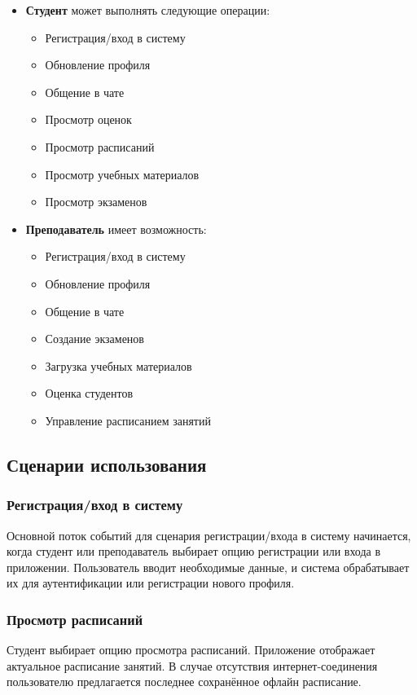 \documentclass[a4paper,12pt]{article}
\begin{document}
\begin{itemize}
    \item \textbf{Студент} может выполнять следующие операции:
    \begin{itemize}
        \item Регистрация/вход в систему
        \item Обновление профиля
        \item Общение в чате
        \item Просмотр оценок
        \item Просмотр расписаний
        \item Просмотр учебных материалов
        \item Просмотр экзаменов
    \end{itemize}
    \item \textbf{Преподаватель} имеет возможность:
    \begin{itemize}
        \item Регистрация/вход в систему
        \item Обновление профиля
        \item Общение в чате
        \item Создание экзаменов
        \item Загрузка учебных материалов
        \item Оценка студентов
        \item Управление расписанием занятий
    \end{itemize}
\end{itemize}

\subsection{Сценарии использования}
\subsubsection{Регистрация/вход в систему}
Основной поток событий для сценария регистрации/входа в систему начинается, когда студент или преподаватель выбирает опцию регистрации или входа в приложении. Пользователь вводит необходимые данные, и система обрабатывает их для аутентификации или регистрации нового профиля.

\subsubsection{Просмотр расписаний}
Студент выбирает опцию просмотра расписаний. Приложение отображает актуальное расписание занятий. В случае отсутствия интернет-соединения пользователю предлагается последнее сохранённое офлайн расписание.
\end{document}
